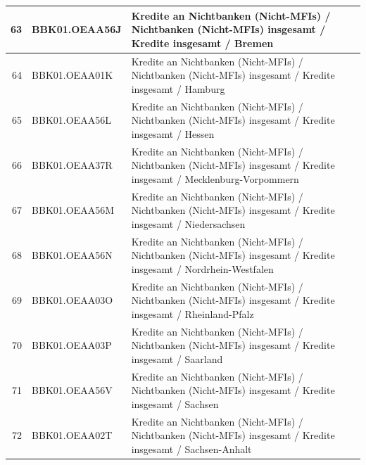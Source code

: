 \documentclass[12pt]{article}
\begin{document}
\begin{table}
\begin{tabular}{rp{5cm}p{11cm}}
  \hline
  63 & BBK01.OEAA56J & Kredite an Nichtbanken (Nicht-MFIs) / Nichtbanken (Nicht-MFIs) insgesamt / Kredite insgesamt / Bremen \\ 
  \hline
  64 & BBK01.OEAA01K & Kredite an Nichtbanken (Nicht-MFIs) / Nichtbanken (Nicht-MFIs) insgesamt / Kredite insgesamt / Hamburg \\ 
  \hline
  65 & BBK01.OEAA56L & Kredite an Nichtbanken (Nicht-MFIs) / Nichtbanken (Nicht-MFIs) insgesamt / Kredite insgesamt / Hessen \\ 
  \hline
  66 & BBK01.OEAA37R & Kredite an Nichtbanken (Nicht-MFIs) / Nichtbanken (Nicht-MFIs) insgesamt / Kredite insgesamt / Mecklenburg-Vorpommern \\ 
  \hline
  67 & BBK01.OEAA56M & Kredite an Nichtbanken (Nicht-MFIs) / Nichtbanken (Nicht-MFIs) insgesamt / Kredite insgesamt / Niedersachsen \\ 
  \hline
  68 & BBK01.OEAA56N & Kredite an Nichtbanken (Nicht-MFIs) / Nichtbanken (Nicht-MFIs) insgesamt / Kredite insgesamt / Nordrhein-Westfalen \\ 
  \hline
  69 & BBK01.OEAA03O & Kredite an Nichtbanken (Nicht-MFIs) / Nichtbanken (Nicht-MFIs) insgesamt / Kredite insgesamt / Rheinland-Pfalz \\ 
  \hline
  70 & BBK01.OEAA03P & Kredite an Nichtbanken (Nicht-MFIs) / Nichtbanken (Nicht-MFIs) insgesamt / Kredite insgesamt / Saarland \\ 
  \hline
  71 & BBK01.OEAA56V & Kredite an Nichtbanken (Nicht-MFIs) / Nichtbanken (Nicht-MFIs) insgesamt / Kredite insgesamt / Sachsen \\ 
  \hline
  72 & BBK01.OEAA02T & Kredite an Nichtbanken (Nicht-MFIs) / Nichtbanken (Nicht-MFIs) insgesamt / Kredite insgesamt / Sachsen-Anhalt \\ 

 \end{tabular}
\end{table}
\end{document}
